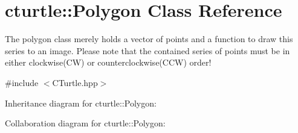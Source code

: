 \hypertarget{classcturtle_1_1Polygon}{}\section{cturtle\+:\+:Polygon Class Reference}
\label{classcturtle_1_1Polygon}


The polygon class merely holds a vector of points and a function to draw this series to an image. Please note that the contained series of points must be in either clockwise(\+C\+W) or counterclockwise(\+C\+C\+W) order!  




{\ttfamily \#include $<$C\+Turtle.\+hpp$>$}



Inheritance diagram for cturtle\+:\+:Polygon\+:


Collaboration diagram for cturtle\+:\+:Polygon\+:
